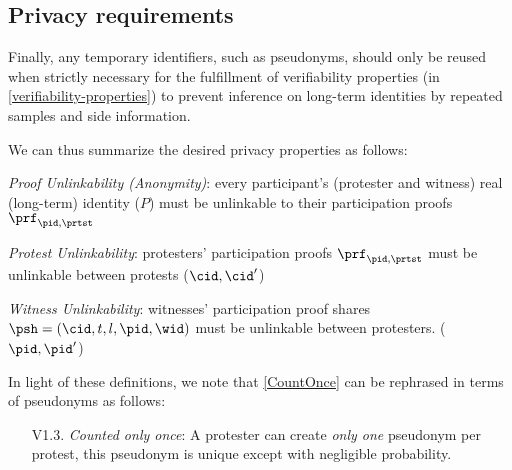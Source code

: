 \subsection{Privacy requirements}%
\label{privacy-properties}

Finally, any temporary identifiers, such as pseudonyms, should only be reused 
when strictly necessary for the fulfillment of verifiability properties (in 
\cref{verifiability-properties}) to prevent inference on long-term identities 
by repeated samples and side information.

We can thus summarize the desired privacy properties as follows:
\begin{requirements}[P]
\item\label{ProofUnlink} \emph{Proof Unlinkability (Anonymity)}: every 
  participant's (protester and witness) real (long-term) identity (\(P\)) must 
  be unlinkable to their participation proofs \(\prf_{\pid, \prtst}\)
\item\label{ProtestUnlink} \emph{Protest Unlinkability}: protesters' participation proofs \(\prf_{\pid, \prtst}\) must be unlinkable between protests (\(\cid, \cid' \))
\item\label{WitnessUnlink}\emph{Witness Unlinkability}:  witnesses' participation proof shares \(\psh = (\cid, t, l, \pid,\wid)\) must be unlinkable between protesters. (\(\pid, \pid' \))
\end{requirements}

In light of these definitions, we note that \cref{CountOnce} can be rephrased 
in terms of pseudonyms as follows:
\begin{enumerate}
  \item[V1.3.] \emph{Counted only once}:
    A protester can create \emph{only one} pseudonym per protest, this 
    pseudonym is unique except with negligible probability.
\end{enumerate}


